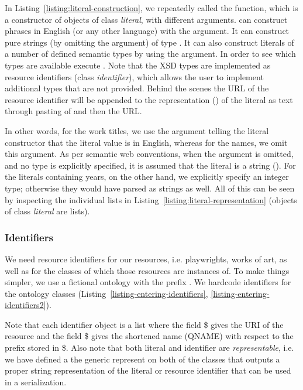 In Listing~\ref{listing:literal-construction}, we repeatedly called the  function, which is a constructor of objects of class \emph{literal}, with different arguments.  can construct phrases in English (or any other language) with the  argument. It can construct pure strings (by omitting the  argument) of type . It can also construct literals of a number of defined semantic types by using the  argument. In order to see which types are available execute . Note that the XSD types are implemented as resource identifiers (class \emph{identifier}), which allows the user to implement additional types that are not provided. Behind the scenes the URL of the resource identifier will be appended to the representation () of the literal as text through pasting of \cl{\textasciicircum\textasciicircum} and then the URL.

In other words, for the work titles, we use the argument  telling the literal constructor that the literal value is in English, whereas for the names, we omit this argument. As per semantic web conventions, when the argument is omitted, and no type is explicitly specified, it is assumed that the literal is a string (). For the literals containing years, on the other hand, we explicitly specify an integer type; otherwise they would have parsed as strings as well. All of this can be seen by inspecting the individual lists in Listing~\ref{listing:literal-representation} (objects of class \emph{literal} are lists).


\subsubsection{Identifiers}

We need resource identifiers for our resources, i.e. playwrights, works of art, as well as for the classes of which those resources are instances of. To make things simpler, we use a fictional ontology with the prefix . We hardcode identifiers for the ontology classes (Listing~\ref{listing-entering-identifiers}, \ref{listing-entering-identifiers2}).

Note that each identifier object is a list where the field \$ gives the URI of the resource and the field \$ gives the shortened name (QNAME) with respect to the prefix stored in \$. Also note that both literal and identifier are \emph{representable}, i.e. we have defined a the generic represent on both of the classes that outputs a proper string representation of the literal or resource identifier that can be used in a serialization.

